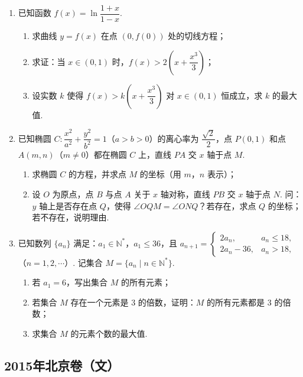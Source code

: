 \begin{description}
\begin{enumerate}[leftmargin=5pt]
        \item 已知函数 \(f(x)=\ln\dfrac{1+x}{1-x}\).

\begin{enumerate}
\item 求曲线 \(y=f(x)\) 在点 \((0,f(0))\) 处的切线方程；
\item 求证：当 \(x\in(0,1)\) 时，\(f(x)>2\left(x+\dfrac{x^3}{3}\right)\)；
\item 设实数 \(k\) 使得 \(f(x)>k\left(x+\dfrac{x^3}{3}\right)\) 对 \(x\in(0,1)\) 恒成立，求 \(k\) 的最大值.
\end{enumerate}

        \item 已知椭圆 \(C:\dfrac{x^2}{a^2}+\dfrac{y^2}{b^2}=1\)（\(a>b>0\)）的离心率为 \(\dfrac{\sqrt{2}}{2}\)，点 \(P(0,1)\) 和点 \(A(m,n)\)（\(m\neq 0\)）都在椭圆 \(C\) 上，直线 \(PA\) 交 \(x\) 轴于点 \(M\).

\begin{enumerate}
\item 求椭圆 \(C\) 的方程，并求点 \(M\) 的坐标（用 \(m\)，\(n\) 表示）；
\item 设 \(O\) 为原点，点 \(B\) 与点 \(A\) 关于 \(x\) 轴对称，直线 \(PB\) 交 \(x\) 轴于点 \(N\). 问：\(y\) 轴上是否存在点 \(Q\)，使得 \(\angle OQM=\angle ONQ\)？若存在，求点 \(Q\) 的坐标；若不存在，说明理由.
\end{enumerate}

        \item 已知数列 \(\{a_n\}\) 满足：\(a_1\in\mathbb{N}^*\)，\(a_1\leqslant 36\)，且 \(a_{n+1}=\begin{cases}
2a_n, & a_n\leqslant 18,\\
2a_n-36, & a_n>18,
\end{cases}\)（\(n=1,2,\cdots\)）. 记集合 \(M=\{a_n\mid n\in\mathbb{N}^*\}\).

\begin{enumerate}
\item 若 \(a_1=6\)，写出集合 \(M\) 的所有元素；
\item 若集合 \(M\) 存在一个元素是 \(3\) 的倍数，证明：\(M\) 的所有元素都是 \(3\) 的倍数；
\item 求集合 \(M\) 的元素个数的最大值.
\end{enumerate}

    \end{enumerate}

\end{description}


\subsection{2015年北京卷（文）}\label{gk:2015年北京卷（文）}


